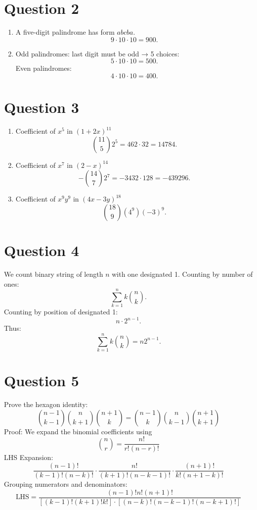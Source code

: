 \documentclass[twoside]{article}
\begin{document}
\newpage

\section*{Question 2}
\begin{enumerate}
    \item[(a)] A five-digit palindrome has form \(abcba\).  \[9\cdot 10\cdot 10 = 900.\]
    \item[(b)] Odd palindromes: last digit must be odd → 5 choices: \[5\cdot 10 \cdot 10 = 500.\] 
               Even palindromes:\[4\cdot 10 \cdot 10 = 400.\]
\end{enumerate}

\section*{Question 3}
\begin{enumerate}
    \item[(a)]  Coefficient of \(x^5\) in \((1+2x)^{11}\) \[\binom{11}{5}2^5 = 462\cdot 32 = 14784.\]
    \item[(b)]  Coefficient of \(x^7\) in \((2-x)^{14}\) \[-\binom{14}{7}2^7 = -3432\cdot 128 = -439296.\]
    \item[(c)]  Coefficient of \(x^9 y^9\) in \((4x-3y)^{18}\) \[\binom{18}{9}(4^9)(-3)^9.\]
\end{enumerate}

\section*{Question 4}
We count binary string of length \(n\) with one designated 1.
Counting by number of ones: \[\sum_{k=1}^{n} k\binom{n}{k}.\]
Counting by position of designated 1: \[n\cdot 2^{n-1}.\]
Thus: \[\sum_{k=1}^{n} k\binom{n}{k} = n2^{n-1}.\]

\newpage

\section*{Question 5}
Prove the hexagon identity: \[ \binom{n-1}{k-1}\binom{n}{k+1}\binom{n+1}{k} = \binom{n-1}{k}\binom{n}{k-1}\binom{n+1}{k+1} \]
Proof: We expand the binomial coefficients using \[\binom{n}{r} = \frac{n!}{r!(n-r)!}\]
LHS Expansion: \[\frac{(n-1)!}{(k-1)!(n-k)!} \cdot \frac{n!}{(k+1)!(n-k-1)!} \cdot \frac{(n+1)!}{k!(n+1-k)!} \]
Grouping numerators and denominators:\[ \text{LHS} = \frac{(n-1)! n! (n+1)!}{ [(k-1)! (k+1)! k!] \cdot [(n-k)! (n-k-1)! (n-k+1)!] }\]
\end{document}
